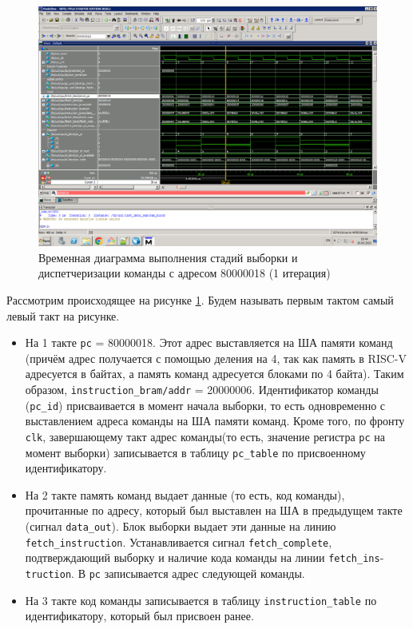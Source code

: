 \begin{figure}[h!p]
	\centering
	\includegraphics[width = \linewidth]{img/var4fetch.png}
	\caption{Временная диаграмма выполнения стадий выборки и диспетчеризации команды с адресом 80000018 (1 итерация)}
	\label{var4fetch}
\end{figure}
Рассмотрим происходящее на рисунке \ref{var4fetch}. Будем называть первым тактом самый левый такт на рисунке.
\begin{itemize}
	\item На 1 такте \verb|pc| = 80000018. Этот адрес выставляется на ША памяти команд (причём адрес получается с помощью деления на 4, так как память в RISC-V адресуется в байтах, а память команд адресуется блоками по 4 байта). Таким образом, \verb|instruction_bram/addr| = 20000006. Идентификатор команды (\verb|pc_id|) присваивается в момент начала выборки, то есть одновременно с выставлением адреса команды на ША памяти команд. Кроме того, по фронту \verb|clk|, завершающему такт адрес команды(то есть, значение регистра \verb|pc| на момент выборки) записывается в таблицу \verb|pc_table| по присвоенному идентификатору.  
	\item На 2 такте память команд выдает данные (то есть, код команды), прочитанные по адресу, который был выставлен на ША в предыдущем такте (сигнал \verb|data_out|). Блок выборки выдает эти данные на линию \verb|fetch_instruction|. Устанавливается сигнал \verb|fetch_complete|, подтверждающий выборку и наличие кода команды на линии \verb|fetch_ins|-\verb|truction|. В \verb|pc| записывается адрес следующей команды.
	\item На 3 такте код команды записывается в таблицу \verb|instruction_table| по идентификатору, который был присвоен ранее.
\end{itemize}



